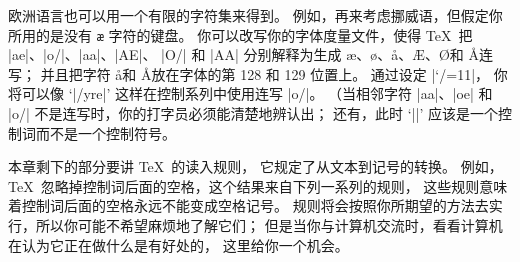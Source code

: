 {%
\ddanger 欧洲语言也可以用一个有限的字符集来得到。
例如，再来考虑挪威语，但假定你所用的是没有 {\tt\ae} 字符的键盘。
\1你可以改写你的字体度量文件，使得 \TeX\ 把 |ae|、|o/|、|aa|、|AE|、
|O/| 和 |AA| 分别解释为生成 \ae 、\o 、\aa 、\AE 、\O 和 \AA 连写；
并且把字符 \aa 和 \AA 放在字体的第 128 和 129 位置上。
通过设定 |\catcode`/=11|，
你将可以像 `|\ho/yre|' 这样在控制系列中使用连写 |o/|。%
（当相邻字符 |aa|、|oe| 和 |o/| 不是连写时，你的打字员必须能清楚地辨认出；
还有，此时 `|\/|' 应该是一个控制词而不是一个控制符号。

\ddanger 本章剩下的部分要讲 \TeX\ 的读入规则，
它规定了从文本到记号的转换。%
例如，\TeX\ 忽略掉控制词后面的空格，这个结果来自下列一系列的规则，
这些规则意味着控制词后面的空格永远不能变成空格记号。%
规则将会按照你所期望的方法去实行，所以你可能不希望麻烦地了解它们；
但是当你与计算机交流时，看看计算机在认为它正在做什么是有好处的，
这里给你一个机会。

}
